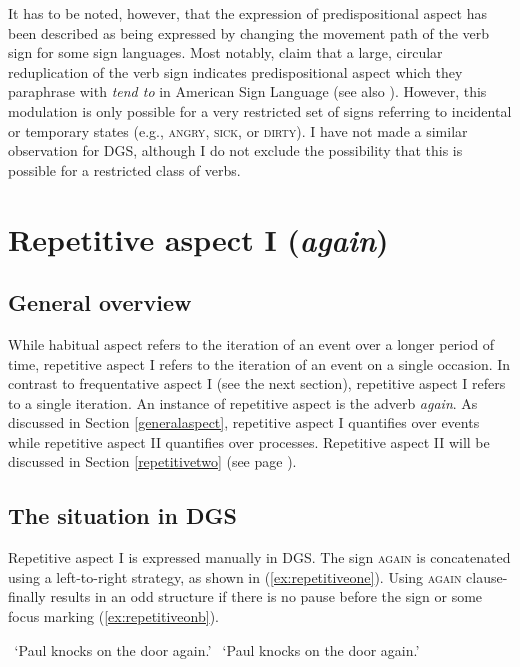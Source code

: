 \noindent It has to be noted, however, that the expression of predispositional aspect has been described as being expressed by changing the movement path of the verb sign for some sign languages. Most notably, \citet[249]{klima1979signs} claim that a large, circular reduplication of the verb sign indicates predispositional aspect which they paraphrase with \textit{tend to} in American Sign Language (see also \citealt{rathmann2005event}). However, this modulation is only possible for a very restricted set of signs referring to incidental or temporary states (e.g., \textsc{angry}, \textsc{sick}, or \textsc{dirty}). I have not made a similar observation for DGS, although I do not exclude the possibility that this is possible for a restricted class of verbs.  

\section{Repetitive aspect I (\textit{again})}\label{repetitiveonesection}
\subsection{General overview}

While habitual aspect refers to the iteration of an event over a longer period of time, repetitive aspect I refers to the iteration of an event on a single occasion. In contrast to frequentative aspect I (see the next section), repetitive aspect I refers to a single iteration. An instance of repetitive aspect is the adverb \textit{again}. As discussed in Section \ref{generalaspect}, repetitive aspect I quantifies over events while repetitive aspect II quantifies over processes. Repetitive aspect II will be discussed in Section \ref{repetitivetwo} (see page \pageref{repetitivetwo}). 

\subsection{The situation in DGS}
Repetitive aspect I is expressed manually in DGS. The sign \textsc{again} is concatenated using a left-to-right strategy, as shown in (\ref{ex:repetitiveone}). Using \textsc{again} clause-finally results in an odd structure if there is no pause before the sign or some focus marking (\ref{ex:repetitiveonb}).

\begin{exe}
\ex\begin{xlist} 
\glt \textcolor{white}{?}`Paul knocks on the door again.' \label{ex:repetitiveone}
\glt \textcolor{white}{?}`Paul knocks on the door again.' \label{ex:repetitiveonb}
\end{xlist}
\end{exe}  

